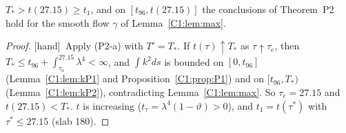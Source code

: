 \documentclass[11pt]{article}
\newcommand{\tH}{\textup{[hand]}}\newcommand{\tS}{\textup{[sym]}}\newcommand{\tC}{\textup{[cert]}}\newcommand{\tI}{\textup{[cited]}}\newcommand{\tN}{\textup{[num]}}
\begin{document}
\begin{proposition}[identification on P2]\label{C1:prop:P2}
$T_*>t(27.15)\ge t_1$, and on $[t_{96},t(27.15)]$ the conclusions of Theorem~P2 hold for the smooth flow $\gamma$ of Lemma~\ref{C1:lem:max}.
\end{proposition}
\begin{proof}\tH\ Apply (P2-a) with $T'=T_*$. If $t(\tau)\uparrow T_*$ as $\tau\uparrow\tau_e$, then $T_*\le t_{96}+\int_{\tau_a}^{27.15}\lambda^4<\infty$, and $\int k^2ds$ is bounded on $[0,t_{96}]$ (Lemma~\ref{C1:lem:kP1} and Proposition~\ref{C1:prop:P1}) and on $[t_{96},T_*)$ (Lemma~\ref{C1:lem:kP2}), contradicting Lemma~\ref{C1:lem:max}. So $\tau_e=27.15$ and $t(27.15)<T_*$. $t$ is increasing ($t_\tau=\lambda^4(1-\vartheta)>0$), and $t_1=t(\tau^*)$ with $\tau^*\le27.15$ (slab 180).
\end{proof}

\end{document}
